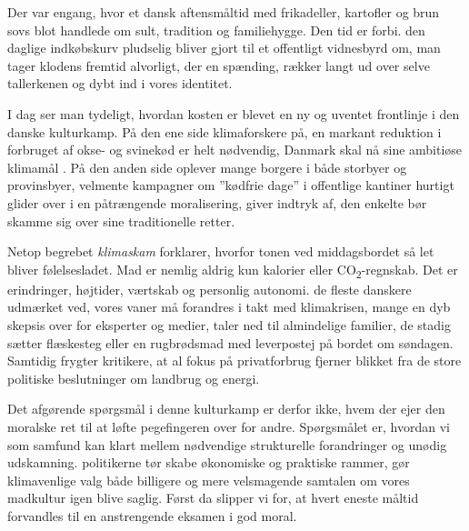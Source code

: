 Der var engang, hvor et dansk aftensmåltid med frikadeller, kartofler og brun sovs blot handlede om sult, tradition og familiehygge. Den tid er forbi.  den daglige indkøbskurv  pludselig bliver gjort til et offentligt vidnesbyrd om,  man tager klodens fremtid alvorligt,  der en spænding,  rækker langt ud over selve tallerkenen og dybt ind i vores identitet.

I dag ser man tydeligt, hvordan kosten er blevet en ny og uventet frontlinje i den danske kulturkamp. På den ene side  klimaforskere på,  en markant reduktion i forbruget af okse- og svinekød er helt nødvendig,  Danmark skal nå sine ambitiøse klimamål . På den anden side oplever mange borgere i både storbyer og provinsbyer,  velmente kampagner om ”kødfrie dage” i offentlige kantiner hurtigt glider over i en påtrængende moralisering,  giver indtryk af,  den enkelte bør skamme sig over sine traditionelle retter.

Netop begrebet \textit{klimaskam} forklarer, hvorfor tonen ved middagsbordet så let bliver følelsesladet. Mad er nemlig aldrig kun kalorier eller CO\textsubscript{2}-regnskab. Det er erindringer, højtider, værtskab og personlig autonomi.  de fleste danskere udmærket ved,  vores vaner må forandres i takt med klimakrisen,  mange en dyb skepsis over for eksperter og medier,   taler ned til almindelige familier,  de stadig sætter flæskesteg eller en rugbrødsmad med leverpostej på bordet om søndagen. Samtidig frygter kritikere, at al fokus på privatforbrug fjerner blikket fra de store politiske beslutninger om landbrug og energi.

Det afgørende spørgsmål i denne kulturkamp er derfor ikke, hvem der ejer den moralske ret til at løfte pegefingeren over for andre. Spørgsmålet er, hvordan vi som samfund kan  klart mellem nødvendige strukturelle forandringer og unødig udskamning.  politikerne tør skabe økonomiske og praktiske rammer,  gør klimavenlige valg både billigere og mere velsmagende   samtalen om vores madkultur igen blive saglig. Først da slipper vi for, at hvert eneste måltid forvandles til en anstrengende eksamen i god moral.

